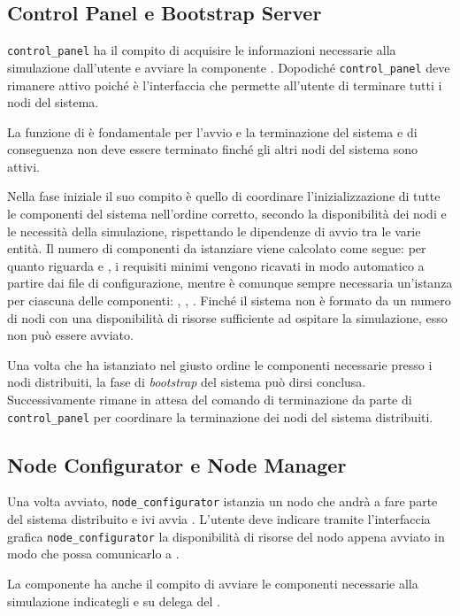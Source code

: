 \subsection{Control Panel e Bootstrap Server}
\texttt{control\_panel} ha il compito di acquisire le informazioni necessarie alla simulazione dall'utente e avviare la componente \bootserv{}. Dopodiché \texttt{control\_panel} deve rimanere attivo poiché è l'interfaccia che permette all'utente di terminare tutti i nodi del sistema.

La funzione di \bootserv{} è fondamentale per l'avvio e la terminazione del sistema e di conseguenza non deve essere terminato finché gli altri nodi del sistema sono attivi.

Nella fase iniziale il suo compito è quello di coordinare l'inizializzazione di tutte le componenti del sistema nell'ordine corretto, secondo la disponibilità dei nodi e le necessità della simulazione, rispettando le dipendenze di avvio tra le varie entità.
Il numero di componenti da istanziare viene calcolato come segue: per quanto riguarda \car{} e \team{}, i requisiti minimi vengono ricavati in modo automatico a partire dai file di configurazione, mentre è comunque sempre necessaria un'istanza per ciascuna delle componenti: \evdisp{}, \sched{}, \weather{}. Finché il sistema non è formato da un numero di nodi con una disponibilità di risorse sufficiente ad ospitare la simulazione, esso non può essere avviato.

Una volta che \bootserv{} ha istanziato nel giusto ordine le componenti necessarie presso i nodi distribuiti, la fase di \textit{bootstrap} del sistema può dirsi conclusa.
Successivamente \bootserv{} rimane in attesa del comando di terminazione da parte di \texttt{control\_panel} per coordinare la terminazione dei nodi del sistema distribuiti.

\subsection{Node Configurator e Node Manager}
Una volta avviato, \texttt{node\_configurator} istanzia un nodo che andrà a fare parte del sistema distribuito e ivi avvia \nodeman{}. L'utente deve indicare tramite l'interfaccia grafica \texttt{node\_configurator} la disponibilità di risorse del nodo appena avviato in modo che \nodeman{} possa comunicarlo a \bootserv{}.

La componente \nodeman{} ha anche il compito di avviare le componenti necessarie alla simulazione indicategli e su delega del \bootserv{}.


